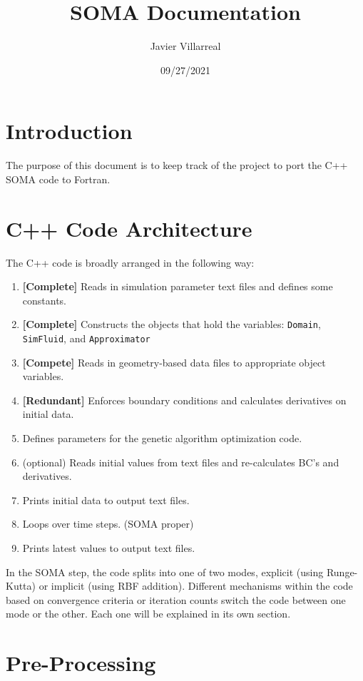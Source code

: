 \documentclass[12pt]{article}
\begin{document}
    \title{SOMA Documentation}
    \author{Javier Villarreal}
    \date{09/27/2021}
    \maketitle

    \section{Introduction}
        The purpose of this document is to keep track of the project to port the C++ SOMA code to Fortran.

    \section{C++ Code Architecture}
        The C++ code is broadly arranged in the following way:
        \begin{enumerate}
            \item \textbf{[Complete]} Reads in simulation parameter text files and defines some constants.
            \item \textbf{[Complete]} Constructs the objects that hold the variables: \texttt{Domain}, \texttt{SimFluid}, and \texttt{Approximator}
            \item \textbf{[Compete]} Reads in geometry-based data files to appropriate object variables.
            \item \textbf{[Redundant]} Enforces boundary conditions and calculates derivatives on initial data.
            \item Defines parameters for the genetic algorithm optimization code.
            \item (optional) Reads initial values from text files and re-calculates BC's and derivatives.
            \item Prints initial data to output text files.
            \item Loops over time steps. (SOMA proper)
            \item Prints latest values to output text files.
        \end{enumerate}
        In the SOMA step, the code splits into one of two modes, explicit (using Runge-Kutta) or implicit (using RBF addition). Different mechanisms within the code based on convergence criteria or iteration counts switch the code between one mode or the other. Each one will be explained in its own section.
    
    \section{Pre-Processing}
\end{document}
